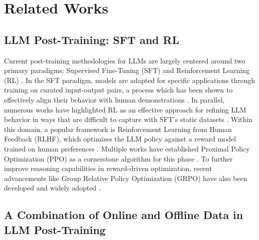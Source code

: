 \section{Related Works}

\subsection{LLM Post-Training: SFT and RL}

Current post-training methodologies for LLMs are largely centered around two primary paradigms: Supervised Fine-Tuning (SFT) and Reinforcement Learning (RL) \citep{wei2021finetuned, ouyang2022training}. In the SFT paradigm, models are adapted for specific applications through training on curated input-output pairs, a process which has been shown to effectively align their behavior with human demonstrations \citep{chung2022scaling, longpre2023flan,touvron2023llama, touvron2023llama2}. 
In parallel, numerous works have highlighted RL as an effective approach for refining LLM behavior in ways that are difficult to capture with SFT's static datasets \citep{glaese2022improving, bai2022training, nakano2021webgpt}. Within this domain, a popular framework is Reinforcement Learning from Human Feedback (RLHF), which optimizes the LLM policy against a reward model trained on human preferences \citep{christiano2017deep, stiennon2020learning}. Multiple works have established Proximal Policy Optimization (PPO) as a cornerstone algorithm for this phase \citep{schulman2017proximal, ziegler2019fine}. To further improve reasoning capabilities in reward-driven optimization, recent advancements like Group Relative Policy Optimization (GRPO) have also been developed and widely adopted \citep{shao2024deepseekmath, zheng2025group, chen2025minimax}.


\subsection{A Combination of Online and Offline Data in LLM Post-Training}


